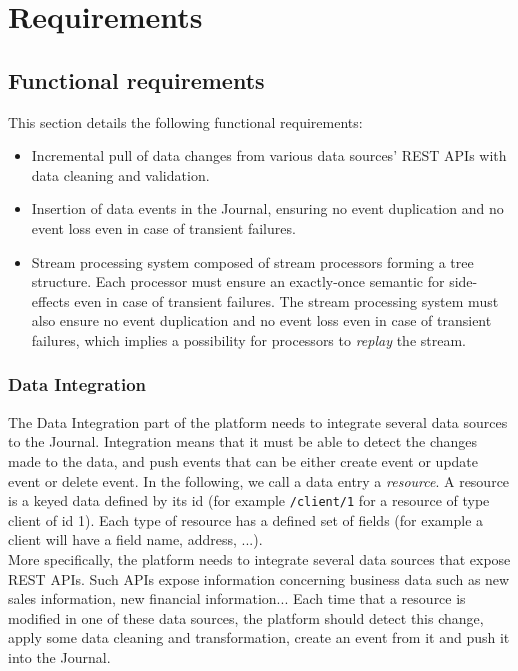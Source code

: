 \chapter{Requirements}

\section{Functional requirements}

This section details the following functional requirements:
\begin{itemize}
  \item Incremental pull of data changes from various data sources' REST APIs with data cleaning and validation.
  \item Insertion of data events in the Journal, ensuring no event duplication and no event loss even in case of transient failures.
  \item Stream processing system composed of stream processors forming a tree structure. Each processor must ensure an exactly-once semantic for side-effects even in case of transient failures. The stream processing system must also ensure no event duplication and no event loss even in case of transient failures, which implies a possibility for processors to \textit{replay} the stream.
\end{itemize}

\subsection{Data Integration}

The Data Integration part of the platform needs to integrate several data sources to the Journal. Integration means that it must be able 
to detect the changes made to the data, and push events that can be either create event or update event or delete event.
In the following, we call a data entry a \textit{resource}. A resource is a keyed data defined by its id (for example \verb|/client/1| for a
resource of type client of id 1). Each type of resource has a defined set of fields (for example a client
will have a field name, address, ...).
\\

More specifically, the platform needs to integrate several data sources that expose REST APIs. Such APIs expose information
concerning business data such as new sales information, new financial information...
Each time that a resource is modified in one of these data sources, the platform should detect this change, apply some data cleaning and transformation, create an 
event from it and push it into the Journal.

